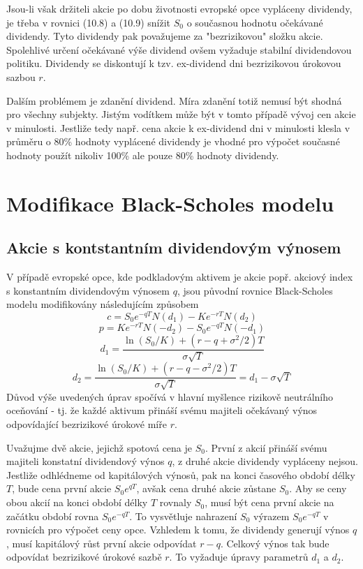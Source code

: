 \documentclass[a4paper]{book}
\begin{document}
Jsou-li však držiteli akcie po dobu životnosti evropské opce vypláceny dividendy, je třeba v rovnici (10.8) a (10.9) snížit $S_0$ o současnou hodnotu očekávané dividendy. Tyto dividendy pak považujeme za "bezrizikovou" složku akcie. Spolehlivé určení očekávané výše dividend ovšem vyžaduje stabilní dividendovou politiku. Dividendy se diskontují k tzv. ex-dividend dni bezrizikovou úrokovou sazbou $r$.

Dalším problémem je zdanění dividend. Míra zdanění totiž nemusí být shodná pro všechny subjekty. Jistým vodítkem může být v tomto případě vývoj cen akcie v minulosti. Jestliže tedy např. cena akcie k ex-dividend dni v minulosti klesla v průměru o 80\% hodnoty vyplácené dividendy je vhodné pro výpočet současné hodnoty použít nikoliv 100\% ale pouze 80\% hodnoty dividendy.

\section{Modifikace Black-Scholes modelu}

\subsection{Akcie s kontstantním dividendovým výnosem}

V případě evropské opce, kde podkladovým aktivem je akcie popř. akciový index s konstantním dividendovým výnosem $q$, jsou původní rovnice Black-Scholes modelu modifikovány následujícím způsobem
\begin{equation*}
c = S_0 e^{-qT} N(d_1) - Ke^{-rT}N(d_2)
\end{equation*}
\begin{equation*}
p = K e^{-rT}N(-d_2)-S_0e^{-qT}N(-d_1)
\end{equation*}
\begin{equation*}
d_1 = \frac{\ln (S_0/K)+(r-q+\sigma^2/2)T}{\sigma \sqrt{T}}
\end{equation*}
\begin{equation*}
d_2 = \frac{\ln (S_0/K)+(r-q-\sigma^2/2)T}{\sigma \sqrt{T}}=d_1-\sigma \sqrt{T}
\end{equation*}
Důvod výše uvedených úprav spočívá v hlavní myšlence rizikově neutrálního oceňování - tj. že každé aktivum přináší svému majiteli očekávaný výnos odpovídající bezrizikové úrokové míře $r$.

Uvažujme dvě akcie, jejichž spotová cena je $S_0$. První z akcií přináší svému majiteli konstatní dividendový výnos $q$, z druhé akcie dividendy vypláceny nejsou. Jestliže odhlédneme od kapitálových výnosů, pak na konci časového období délky $T$, bude cena první akcie $S_0e^{qT}$, avšak cena druhé akcie zůstane $S_0$. Aby se ceny obou akcií na konci období délky $T$ rovnaly $S_0$, musí být cena první akcie na začátku období rovna $S_0e^{-qT}$. To vysvětluje nahrazení $S_0$ výrazem $S_0e^{-qT}$ v rovnicích pro výpočet ceny opce. Vzhledem k tomu, že dividendy generují výnos $q$, musí kapitálový růst první akcie odpovídat $r-q$. Celkový výnos tak bude odpovídat bezrizikové úrokové sazbě $r$. To vyžaduje úpravy parametrů $d_1$ a $d_2$. 
\end{document}
